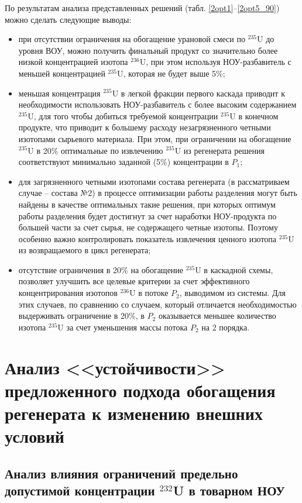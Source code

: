 По результатам анализа представленных решений (табл. \ref{2opt1}--\ref{2opt5_90}) можно сделать следующие выводы:
\begin{itemize}
    \item при отсутствии ограничения на обогащение урановой смеси по $^{235}$U до уровня ВОУ, можно получить финальный продукт со значительно более низкой концентрацией изотопа $^{236}$U, при этом используя НОУ-разбавитель с меньшей концентрацией $^{235}$U, которая не будет выше 5\%;
    \item меньшая концентрация $^{235}$U в легкой фракции первого каскада приводит к необходимости использовать НОУ-разбавитель с более высоким содержанием $^{235}$U, для того чтобы добиться требуемой концентрации $^{235}$U в конечном продукте, что приводит к большему расходу незагрязненного четными изотопами сырьевого материала. При этом, при ограничении на обогащение $^{235}$U в 20\% оптимальные по извлечению $^{235}$U из регенерата решения соответствуют минимально заданной (5\%) концентрации в $P_1$;
    \item для загрязненного четными изотопами состава регенерата (в рассматриваем случае -- состава №2) в процессе оптимизации работы разделения могут быть найдены в качестве оптимальных такие решения, при которых оптимум работы разделения будет достигнут за счет наработки НОУ-продукта по большей части за счет сырья, не содержащего четные изотопы. Поэтому особенно важно контролировать показатель извлечения ценного изотопа $^{235}$U из возвращаемого в цикл регенерата;
    \item отсутствие ограничения в 20\% на обогащение $^{235}$U в каскадной схемы, позволяет улучшить все целевые критерии за счет эффективного концентрирования изотопов $^{236}$U в потоке $P_2$, выводимом из системы. Для этих случаев, по сравнению со случаем, который отличается необходимостью выдерживать ограничение в 20\%, в $P_2$ оказывается меньшее количество изотопа $^{235}$U за счет уменьшения массы потока $P_2$ на 2 порядка. 
\end{itemize}


\section{Анализ <<устойчивости>> предложенного подхода обогащения регенерата к изменению внешних условий}
\subsection{Анализ влияния ограничений предельно допустимой концентрации $^{232}$U в товарном НОУ}

